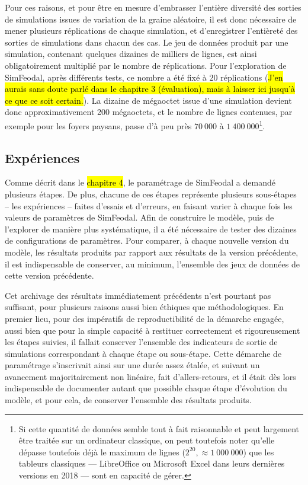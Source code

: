 	Pour ces raisons, et pour être en mesure d'embrasser l'entière diversité des sorties de simulations issues de variation de la graine aléatoire, il est donc nécessaire de mener plusieurs réplications de chaque simulation, et d'enregistrer l'entièreté des sorties de simulations dans chacun des cas.
	Le jeu de données produit par une simulation, contenant quelques dizaines de milliers de lignes, est ainsi obligatoirement multiplié par le nombre de réplications.
	Pour l'exploration de SimFeodal, après différents tests, ce nombre a été fixé à $20$ réplications (\hl{J'en aurais sans doute parlé dans le chapitre 3 (évaluation), mais à laisser ici jusqu'à ce que ce soit certain.}).
	La dizaine de mégaoctet issue d'une simulation devient donc approximativement 200 mégaoctets, et le nombre de lignes contenues, par exemple pour les foyers paysans, passe d'à peu près $70~000$ à $1~400~000$\footnote{
	Si cette quantité de données semble tout à fait raisonnable et peut largement être traitée sur un ordinateur classique, on peut toutefois noter qu'elle dépasse toutefois déjà le maximum de lignes ($2^{20}, \approx 1~000~000$) que les tableurs classiques ---
	LibreOffice ou Microsoft Excel dans leurs dernières versions en 2018
	--- sont en capacité de gérer.
	}.

	\subsection{Expériences}\label{subsec:capter-experiences}

	Comme décrit dans le \hl{chapitre 4}, le paramétrage de SimFeodal a demandé plusieurs étapes.
	De plus, chacune de ces étapes représente plusieurs sous-étapes -- les expériences -- faites d'essais et d'erreurs, en faisant varier à chaque fois les valeurs de paramètres de SimFeodal.
	Afin de construire le modèle, puis de l'explorer de manière plus systématique, il a été nécessaire de tester des dizaines de configurations de paramètres.
	Pour comparer, à chaque nouvelle version du modèle, les résultats produits par rapport aux résultats de la version précédente, il est indispensable de conserver, au minimum, l'ensemble des jeux de données de cette version précédente.

	Cet archivage des résultats immédiatement précédents n'est pourtant pas suffisant, pour plusieurs raisons aussi bien éthiques que méthodologiques.
	En premier lieu, pour des impératifs de reproductibilité de la démarche engagée, aussi bien que pour la simple capacité à restituer correctement et rigoureusement les étapes suivies, il fallait conserver l'ensemble des indicateurs de sortie de simulations correspondant à chaque étape ou sous-étape.
	Cette démarche de paramétrage s'inscrivait ainsi sur une durée assez étalée, et suivant un avancement majoritairement non linéaire, fait d'allers-retours, et il était dès lors indispensable de documenter autant que possible chaque étape d'évolution du modèle, et pour cela, de conserver l'ensemble des résultats produits.
	
